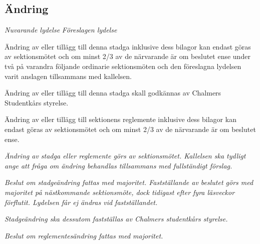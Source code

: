 \documentclass{article}
\newenvironment{lydelse}
    {\begin{paracol}{2}%
        \emph{Nuvarande lydelse}%
        \switchcolumn%
        \emph{Föreslagen lydelse}%
    \end{paracol}%
    \begin{enumerate}[label=\thesubsection.\arabic*]%
    \begin{paracol}{2}%
    }{\end{paracol}\end{enumerate}}
\begin{document}
\subsection{Ändring}
\begin{lydelse}
  \setcounter{subsection}{2}
  \item Ändring av eller tillägg till denna stadga inklusive dess bilagor kan endast göras av sektionsmötet och om minst 2/3 av de närvarande är om beslutet ense under två på varandra följande ordinarie sektionsmöten och den föreslagna lydelsen varit anslagen tillsammans med kallelsen.
  \item Ändring av eller tillägg till denna stadga skall godkännas av Chalmers Studentkårs styrelse.
  \setcounter{subsection}{3}
  \setcounter{enumi}{0}  
  \item Ändring av eller tillägg till sektionens reglemente inklusive dess bilagor kan endast göras av sektionsmötet och om minst 2/3 av de närvarande är om beslutet ense.
  \switchcolumn
  \item \emph{Ändring av stadga eller reglemente görs av sektionsmötet. Kallelsen ska tydligt ange att fråga om ändring behandlas tillsammans med fullständigt förslag.}
  \item \emph{Beslut om stadgeändring fattas med  majoritet.
      Fastställande av beslutet görs med  majoritet på nästkommande sektionsmöte, dock tidigast efter fyra läsveckor förflutit.
      Lydelsen får ej ändras vid fastställandet.}
  \item \emph{Stadgeändring ska dessutom fastställas av Chalmers studentkårs styrelse.}
  \item \emph{Beslut om reglementesändring fattas med  majoritet.}
\end{lydelse}
\setcounter{section}{15}
\setcounter{subsection}{1}
\end{document}
